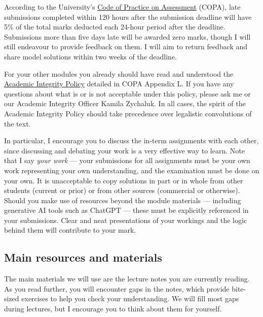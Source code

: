 According to the University's \href{https://www.liverpool.ac.uk/media/livacuk/tqsd/code-of-practice-on-assessment/code_of_practice_on_assessment.pdf}{Code of Practice on Assessment} (COPA), late submissions completed within 120 hours after the submission deadline will have 5\% of the total marks deducted each 24-hour period after the deadline. %
Submissions more than five days late will be awarded zero marks, though I will still endeavour to provide feedback on them.
I will aim to return feedback and share model solutions within two weeks of the deadline.

For your other modules you already should have read and understood the \href{https://www.liverpool.ac.uk/media/livacuk/tqsd/code-of-practice-on-assessment/appendix_L_cop_assess.pdf}{Academic Integrity Policy} detailed in COPA Appendix L.
If you have any questions about what is or is not acceptable under this policy, please ask me or our Academic Integrity Officer Kamila Zychaluk.
In all cases, the spirit of the Academic Integrity Policy should take precedence over legalistic convolutions of the text.

In particular, I encourage you to discuss the in-term assignments with each other, since discussing and debating your work is a very effective way to learn.
Note that I say \textit{your work} --- your submissions for all assignments must be your own work representing your own understanding, and the examination must be done on your own.
It is unacceptable to copy solutions in part or in whole from other students (current or prior) or from other sources (commercial or otherwise).
Should you make use of resources beyond the module materials --- including generative AI tools such as ChatGPT --- these must be explicitly referenced in your submissions.
Clear and neat presentations of your workings and the logic behind them will contribute to your mark.



\subsection*{Main resources and materials}
The main materials we will use are the lecture notes you are currently reading.
As you read further, you will encounter gaps in the notes, which provide bite-sized exercises to help you check your understanding.
We will fill most gaps during lectures, but I encourage you to think about them for yourself.

